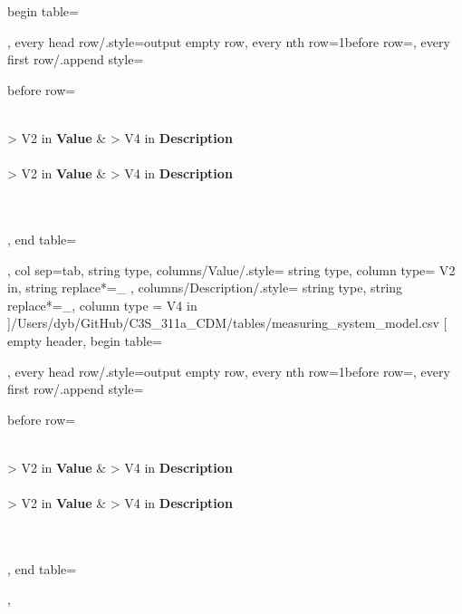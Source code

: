 \documentclass[a4paper]{article}
\begin{document}
    begin table=\begin{longtable},
    every head row/.style={output empty row},
    every nth row={1}{before row=\hline},
    every first row/.append style={
        before row={%
            \caption{Measuring system model}
            \label{tab:DataTable}\\
            \hline\hline {} { > {\centering}V{2 in}} { \textbf{Value}} &  { > {\centering} V{4 in} } {\textbf{Description}} \\ \hline\hline \endfirsthead
             \\
            \hline\hline {} { > {\centering}V{2 in} } { \textbf{Value}} &  { > {\centering} V{4 in} } {\textbf{Description}} \\ \hline\hline \endhead
             \\
            \endfoot
            \hline
             \\ 
            \endlastfoot
        }
    },
    end table=\end{longtable},
    col sep=tab,
    string type,
    columns/Value/.style={
            string type, 
            column type= V{2 in}, 
            string replace*={_}{}
        },
    columns/Description/.style={
            string type, 
            string replace*={_}{},
            column type = V{4 in}
        }
    ]{/Users/dyb/GitHub/C3S_311a_CDM/tables/measuring_system_model.csv}
\pgfplotstabletypeset[
    empty header,
    begin table=\begin{longtable},
    every head row/.style={output empty row},
    every nth row={1}{before row=\hline},
    every first row/.append style={
        before row={%
            \caption{Method of estimating uncertainty}
            \label{tab:DataTable}\\
            \hline\hline {} { > {\centering}V{2 in}} { \textbf{Value}} &  { > {\centering} V{4 in} } {\textbf{Description}} \\ \hline\hline \endfirsthead
             \\
            \hline\hline {} { > {\centering}V{2 in} } { \textbf{Value}} &  { > {\centering} V{4 in} } {\textbf{Description}} \\ \hline\hline \endhead
             \\
            \endfoot
            \hline
             \\ 
            \endlastfoot
        }
    },
    end table=\end{longtable},
\end{document}
